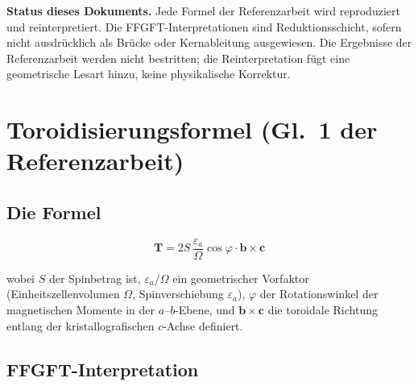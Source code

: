 \noindent\textbf{Status dieses Dokuments.} Jede Formel der Referenzarbeit
wird reproduziert und reinterpretiert. Die FFGFT-Interpretationen sind
Reduktionsschicht, sofern nicht ausdrücklich als Brücke oder Kernableitung
ausgewiesen. Die Ergebnisse der Referenzarbeit werden nicht bestritten;
die Reinterpretation fügt eine geometrische Lesart hinzu, keine physikalische
Korrektur.

\section{Toroidisierungsformel (Gl.~1 der Referenzarbeit)}

\subsection*{Die Formel}

\begin{equation}
  \mathbf{T} = 2S\,\frac{\varepsilon_a}{\Omega}\cos\varphi \cdot \mathbf{b}
  \times \mathbf{c}
  \tag{Ref.~Gl.~1}
\end{equation}

\noindent wobei $S$ der Spinbetrag ist, $\varepsilon_a/\Omega$ ein
geometrischer Vorfaktor (Einheitszellenvolumen $\Omega$, Spinverschiebung
$\varepsilon_a$), $\varphi$ der Rotationswinkel der magnetischen Momente in
der $a$--$b$-Ebene, und $\mathbf{b}\times\mathbf{c}$ die toroidale Richtung
entlang der kristallografischen $c$-Achse definiert.

\subsection*{FFGFT-Interpretation}

